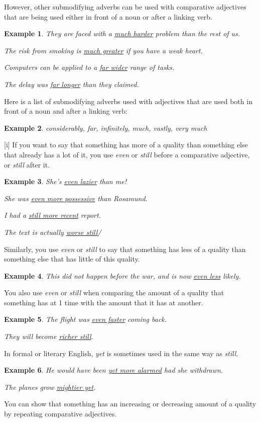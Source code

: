 \documentclass[oneside]{book}
\numberwithin{equation}{section}
\newtheorem{example}{Example}[section]
\begin{document}
%
\noindent{} However, other submodifying adverbs can be used with comparative adjectives that are being used either in front of a noun or after a linking verb.
\begin{example}
    They are faced with a \underline{much harder} problem than the rest of us.
    
    The risk from smoking is \underline{much greater} if you have a weak heart.
    
    Computers can be applied to a \underline{far wider} range of tasks.
    
    The delay was \underline{far longer} than they claimed.
\end{example}
Here is a list of submodifying adverbs used with adjectives that are used both in front of a noun and after a linking verb:
\begin{example}
    considerably, far, infinitely, much, vastly, very much
\end{example}
%
\noindent{} [i] If you want to say that something has more of a quality than something else that already has a lot of it, you use \textit{even} or \textit{still} before a comparative adjective, or \textit{still} after it.
\begin{example}
    She's \underline{even lazier} than me!
    
    She was \underline{even more possessive} than Rosamund.
    
    I had a \underline{still more recent} report.
    
    The text is actually \underline{worse still}/
\end{example}
Similarly, you use \textit{even} or \textit{still} to say that something has less of a quality than something else that has little of this quality.
\begin{example}
    This did not happen before the war, and is now \underline{even less} likely.
\end{example}
You also use \textit{even} or \textit{still} when comparing the amount of a quality that something has at 1 time with the amount that it has at another.
\begin{example}
    The flight was \underline{even faster} coming back.
    
    They will become \underline{richer still}.
\end{example}
In formal or literary English, \textit{yet} is sometimes used in the same way as \textit{still}.
\begin{example}
    He would have been \underline{yet more alarmed} had she withdrawn.
    
    The planes grow \underline{mightier yet}.
\end{example}
%
\noindent{} You can show that something has an increasing or decreasing amount of a quality by repeating comparative adjectives.
\end{document}
